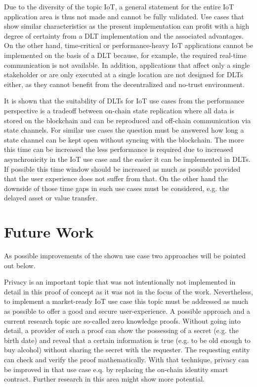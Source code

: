 \documentclass[conference]{IEEEtran}
\begin{document}
Due to the diversity of the topic IoT, a general statement for the entire IoT application area is thus not made and cannot be fully validated. Use cases that show similar characteristics as the present implementation can profit with a high degree of certainty from a DLT implementation and the associated advantages. On the other hand, time-critical or performance-heavy IoT applications cannot be implemented on the basis of a DLT because, for example, the required real-time communication is not available. In addition, applications that affect only a single stakeholder or are only executed at a single location are not designed for DLTs either, as they cannot benefit from the decentralized and no-trust environment.

It is shown that the suitability of DLTs for IoT use cases from the performance perspective is a tradeoff between on-chain state replication where all data is stored on the blockchain and can be reproduced and off-chain communication via state channels. For similar use cases the question must be answered how long a state channel can be kept open without syncing with the blockchain. The more this time can be increased the less performance is required due to increased asynchronicity in the IoT use case and the easier it can be implemented in DLTs. If possible this time window should be increased as much as possible provided that the user experience does not suffer from that. On the other hand the downside of those time gaps in such use cases must be considered, e.g. the delayed asset or value transfer. 

%
\section{Future Work}

As possible improvements of the shown use case two approaches will be pointed out below.

Privacy is an important topic that was not intentionally not implemented in detail in this proof of concept as it was not in the focus of the work. Nevertheless, to implement a market-ready IoT use case this topic must be addressed as much as possible to offer a good and secure user-experience. A possible approach and a current research topic are so-called zero knowledge proofs. Without going into detail, a provider of such a proof can show the possessing of a secret (e.g. the birth date) and reveal that a certain information is true (e.g. to be old enough to buy alcohol) without sharing the secret with the requester. The requesting entity can check and verify the proof mathematically. With that technique, privacy can be improved in that use case e.q. by replacing the on-chain identity smart contract. Further research in this area might show more potential.
\end{document}
